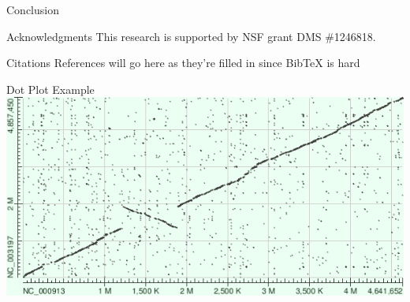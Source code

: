 \documentclass[final]{beamer}
\begin{document}
\begin{frame}{}
\begin{columns}[t]
\begin{column}{.32 \linewidth}
\begin{block}{\large Conclusion}
\end{block}


	
	  \begin{block}{Acknowledgments}
This research is supported by NSF grant DMS \#1246818.
	 \end{block}
\begin{block}{Citations}
References will go here as they're filled in since BibTeX is hard
\end{block}
\begin{block}{Dot Plot Example}
\includegraphics[scale = 1.25]{hit_matrixECSal.png}
\end{block}



        \end{column}

    \end{columns}

  \end{frame}
\end{document}
